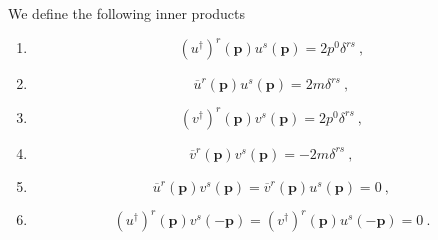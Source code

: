     We define the following inner products 
    \begin{enumerate}
        \item \begin{equation*}
            (u^\dagger)^r (\mathbf p) u^s (\mathbf p) = 2 p^0 \delta^{rs} ~,
        \end{equation*}
        \item \begin{equation*}
            \overline u^r (\mathbf p) u^s (\mathbf p) = 2 m \delta^{rs} ~,
        \end{equation*} 
        \item \begin{equation*}
            (v^\dagger)^r (\mathbf p) v^s (\mathbf p) = 2 p^0 \delta^{rs} ~,
        \end{equation*}
        \item \begin{equation*}
            \overline v^r (\mathbf p) v^s (\mathbf p) = - 2 m \delta^{rs} ~,
        \end{equation*}
        \item \begin{equation*}
            \overline u^r (\mathbf p) v^s (\mathbf p) = \overline v^r (\mathbf p) u^s (\mathbf p) = 0 ~,
        \end{equation*}
        \item \begin{equation*}
            (u^\dagger)^r (\mathbf p) v^s (- \mathbf p) = (v^\dagger)^r (\mathbf p) u^s (- \mathbf p) = 0 ~.
        \end{equation*}
    \end{enumerate}
